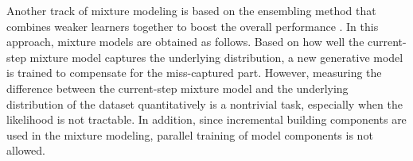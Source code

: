 Another track of mixture modeling is based on the ensembling method that combines weaker learners together to boost the overall performance \cite{grover2017aaai_boost,2017arXiv170102386T}. In this approach, mixture models are obtained as follows. Based on how well the current-step mixture model captures the underlying distribution, a new generative model is trained to compensate for the miss-captured part. However, measuring the difference between the current-step mixture model and the underlying distribution of the dataset quantitatively is a nontrivial task, especially when the likelihood is not tractable. In addition, since incremental building components are used in the mixture modeling, parallel training of model components is not allowed.






